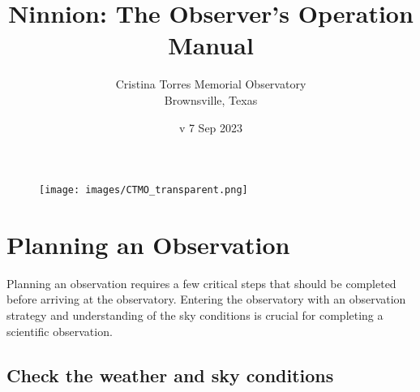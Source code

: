 \documentclass{article}
\title{Ninnion: The Observer's Operation Manual}
\author{Cristina Torres Memorial Observatory \\
	Brownsville, Texas}
\date{v 7 Sep 2023}
\begin{document}
	
	\maketitle
	
	\begin{figure}[b]
		\centering
		\texttt{[image: images/CTMO\_transparent.png]}
	\end{figure}
	
	\newpage
	\tableofcontents
	
	\newpage
	\section{Planning an Observation}
	\label{sec:planning-an-observation}
	
	Planning an observation requires a few critical steps that should be completed before arriving at the observatory. Entering the observatory with an observation strategy and understanding of the sky conditions is crucial for completing a scientific observation.
	
	\subsection{Check the weather and sky conditions}
	\label{sec:check-the-weather-and-sky-conditions}
	
\end{document}
